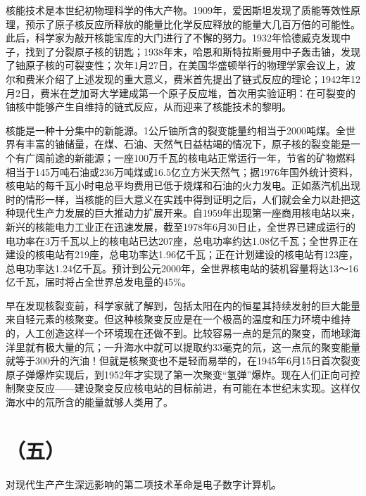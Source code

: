 核能技术是本世纪初物理科学的伟大产物。1909年，爱因斯坦发现了质能等效性原理，预示了原子核反应所释放的能量比化学反应释放的能量大几百万倍的可能性。此后，科学家为敲开核能宝库的大门进行了不懈的努力。1932年恰德威克发现中子，找到了分裂原子核的钥匙；1938年末，哈恩和斯特拉斯曼用中子轰击铀，发现了铀原子核的可裂变性；次年1月27日，在美国华盛顿举行的物理学家会议上，波尔和费米介绍了上述发现的重大意义，费米首先提出了链式反应的理论；1942年12月2日，费米在芝加哥大学建成第一个原子反应堆，首次用实验证明：在可裂变的铀核中能够产生自维持的链式反应，从而迎来了核能技术的黎明。

核能是一种十分集中的新能源。1公斤铀所含的裂变能量约相当于2000吨煤。全世界有丰富的铀储量，在煤、石油、天然气日益枯竭的情况下，原子核的裂变能是一个有广阔前途的新能源；一座100万千瓦的核电站正常运行一年，节省的矿物燃料相当于145万吨石油或236万吨煤或16.5亿立方米天然气；据1976年国外统计资料，核电站的每千瓦小时电总平均费用已低于烧煤和石油的火力发电。正如蒸汽机出现时的情形一样，当核能的巨大意义在实践中得到证明之后，人们就会全力以赴把这种现代生产力发展的巨大推动力扩展开来。自1959年出现第一座商用核电站以来，新兴的核能电力工业正在迅速发展，截至1978年6月30日止，全世界已建成运行的电功率在3万千瓦以上的核电站已达207座，总电功率约达1.08亿千瓦；全世界正在建设的核电站有219座，总电功率达1.96亿千瓦；正在计划建设的核电站有123座，总电功率达1.24亿千瓦。预计到公元2000年，全世界核电站的装机容量将达13～16亿千瓦，届时将占全世界总发电量的45\%。

早在发现核裂变前，科学家就了解到，包括太阳在内的恒星其持续发射的巨大能量来自轻元素的核聚变。但这种核聚变反应是在一个极高的温度和压力环境中维持的，人工创造这样一个环境现在还做不到。比较容易一点的是氘的聚变，而地球海洋里就有极大量的氘；一升海水中就可以提取约33毫克的氘，这一点氘的聚变能量就等于300升的汽油！但就是核聚变也不是轻而易举的，在1945年6月15日首次裂变原子弹爆炸实现后，到1952年才实现了第一次聚变“氢弹”爆炸。现在人们正向可控制聚变反应——建设聚变反应核电站的目标前进，有可能在本世纪末实现。这样仅海水中的氘所含的能量就够人类用了。

\section*{（五）}
对现代生产产生深远影响的第二项技术革命是电子数字计算机。

